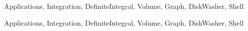 \begin{tagblock}{Applications, Integration, DefiniteIntegral, Volume, Graph, DiskWasher, Shell}
\begin{question}
    
\begin{tags}
       Applications, Integration, DefiniteIntegral, Volume, Graph, DiskWasher, Shell
\end{tags}
    
\begin{diary}
        
\end{diary}
	
\begin{solution}

\end{solution}
	
\end{question}

\end{tagblock}

